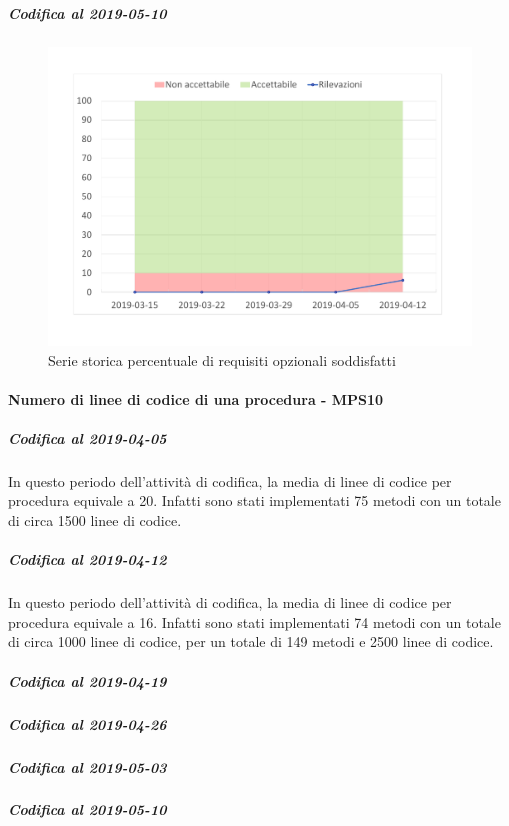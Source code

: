 \subparagraph{Codifica al 2019-05-10}

\begin{figure}[H]
	\centering
	\includegraphics[scale=0.6]{images/resoconto/MPS9Chart.pdf}
	\caption{Serie storica percentuale di requisiti opzionali soddisfatti}	
\end{figure}

\paragraph{Numero di linee di codice di una procedura - MPS10}
\subparagraph{Codifica al 2019-04-05}
In questo periodo dell'attività di codifica, la media di linee di codice per procedura equivale a 20. Infatti sono stati implementati 75 metodi con un totale di circa 1500 linee di codice.

\subparagraph{Codifica al 2019-04-12}
In questo periodo dell'attività di codifica, la media di linee di codice per procedura equivale a 16. Infatti sono stati implementati 74 metodi con un totale di circa 1000 linee di codice, per un totale di 149 metodi e 2500 linee di codice.

\subparagraph{Codifica al 2019-04-19}

\subparagraph{Codifica al 2019-04-26}

\subparagraph{Codifica al 2019-05-03}

\subparagraph{Codifica al 2019-05-10}

